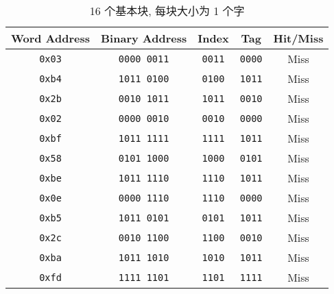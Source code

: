 \documentclass[11pt]{homework}
\begin{document}
\setlength{\intextsep}{0em}
\setlength{\belowdisplayskip}{0pt} \setlength{\belowdisplayshortskip}{0pt}
\setlength{\abovedisplayskip}{0pt} \setlength{\abovedisplayshortskip}{0pt}
\maketitle
\question
\begin{table}[h]
    \centering
    \label{tab:1.1}
    \caption{16 个基本块, 每块大小为 1 个字}
    \begin{tabular}{|c|c|c|c|c|}
        \hline
        Word Address  & Binary Address     & Index         & Tag           & Hit/Miss \\ \hline
        \texttt{0x03} & \texttt{0000 0011} & \texttt{0011} & \texttt{0000} & Miss     \\ \hline
        \texttt{0xb4} & \texttt{1011 0100} & \texttt{0100} & \texttt{1011} & Miss     \\ \hline
        \texttt{0x2b} & \texttt{0010 1011} & \texttt{1011} & \texttt{0010} & Miss     \\ \hline
        \texttt{0x02} & \texttt{0000 0010} & \texttt{0010} & \texttt{0000} & Miss     \\ \hline
        \texttt{0xbf} & \texttt{1011 1111} & \texttt{1111} & \texttt{1011} & Miss     \\ \hline
        \texttt{0x58} & \texttt{0101 1000} & \texttt{1000} & \texttt{0101} & Miss     \\ \hline
        \texttt{0xbe} & \texttt{1011 1110} & \texttt{1110} & \texttt{1011} & Miss     \\ \hline
        \texttt{0x0e} & \texttt{0000 1110} & \texttt{1110} & \texttt{0000} & Miss     \\ \hline
        \texttt{0xb5} & \texttt{1011 0101} & \texttt{0101} & \texttt{1011} & Miss     \\ \hline
        \texttt{0x2c} & \texttt{0010 1100} & \texttt{1100} & \texttt{0010} & Miss     \\ \hline
        \texttt{0xba} & \texttt{1011 1010} & \texttt{1010} & \texttt{1011} & Miss     \\ \hline
        \texttt{0xfd} & \texttt{1111 1101} & \texttt{1101} & \texttt{1111} & Miss     \\ \hline
    \end{tabular}
\end{table}
\end{document}
